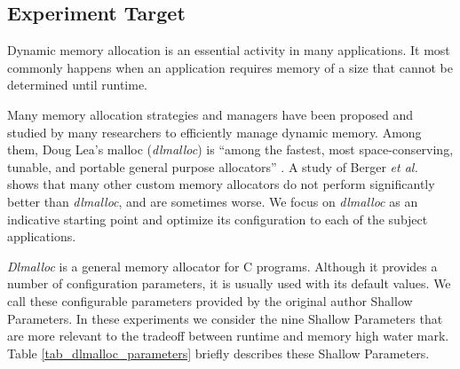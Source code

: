 \subsection{Experiment Target}

Dynamic memory allocation is an essential activity in many applications. It
most commonly happens when an application requires memory of a size that 
cannot be determined until runtime.


Many memory allocation strategies and managers have been proposed and studied by many researchers to efficiently manage dynamic memory. Among them, Doug Lea's malloc (\emph{dlmalloc}) is ``among the fastest, most space-conserving, tunable, and portable general purpose allocators'' \cite{lea1996memory}. A study of Berger \emph{et al.}~\cite{Berger:2002:RCM:582419.582421} shows that many other custom memory allocators do not perform significantly better than \emph{dlmalloc}, and are sometimes worse. We focus on \emph{dlmalloc} as an indicative starting point and optimize its configuration to each of the subject applications.

\emph{Dlmalloc} is a general memory allocator for C
programs. Although it provides a number of configuration parameters,  
it is usually used with its default values. 
We call these configurable parameters provided by the original author
Shallow Parameters. In these experiments we consider the nine Shallow
Parameters that are more relevant to the tradeoff between runtime and
memory high water mark. Table \ref{tab_dlmalloc_parameters} briefly
describes these Shallow Parameters. 

